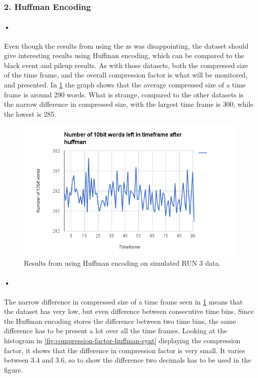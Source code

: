 \documentclass[a4paper, 12pt, openright, twoside]{report}
\begin{document}
\subsubsection{2. Huffman Encoding}

\paragraph{•}
Even though the results from using the \gls{zs} was disappointing, the dataset should give interesting results using Huffman encoding, which can be compared to the black event and pileup results.
As with those datasets, both the compressed size of the time frame, and the overall compression factor is what will be monitored, and presented.
In \ref{fig:synthetic-huffman} the graph shows that the average compressed size of a time frame is around 290 words.
What is strange, compared to the other datasets is the narrow difference in compressed size, with the largest time frame is 300, while the lowest is 285.


\begin{figure}[h!]
	\centering
		\includegraphics[width=1.0\textwidth]{images/huffman-fake-pileup.png}
		\caption{Results from using Huffman encoding on simulated RUN 3 data.}
		\label{fig:synthetic-huffman}
\end{figure}

\paragraph{•}
The narrow difference in compressed size of a time frame seen in \ref{fig:synthetic-huffman} means that the dataset has very low, but even difference between consecutive time bins.
Since the Huffman encoding stores the difference between two time bins, the same difference has to be present a lot over all the time frames.
Looking at the histogram in \ref{fig:compression-factor-huffman-synt} displaying the compression factor, it shows that the difference in compression factor is very small.
It varies between 3.4 and 3.6, so to show the difference two decimals has to be used in the figure.
\end{document}
